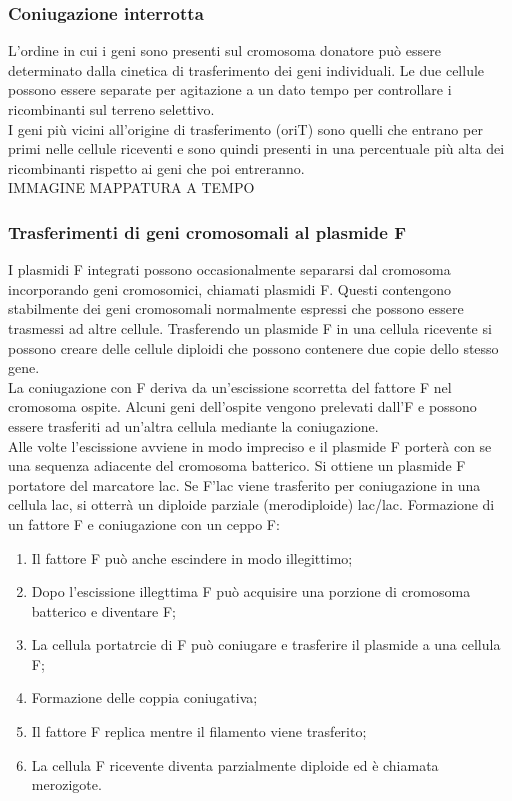\subsubsection{Coniugazione interrotta}
L'ordine in cui i geni sono presenti sul cromosoma donatore può essere determinato dalla cinetica di trasferimento dei geni individuali. Le due cellule possono essere separate per agitazione a un dato tempo per controllare i ricombinanti sul terreno selettivo.
\\I geni più vicini all'origine di trasferimento (oriT) sono quelli che entrano per primi nelle cellule riceventi e sono quindi presenti in una percentuale più alta dei ricombinanti rispetto ai geni che poi entreranno. 
\\IMMAGINE MAPPATURA A TEMPO 
\subsubsection{Trasferimenti di geni cromosomali al plasmide F}
I plasmidi F integrati possono occasionalmente separarsi dal cromosoma incorporando geni cromosomici, chiamati plasmidi F. Questi contengono stabilmente dei geni cromosomali normalmente espressi che possono essere trasmessi ad altre cellule. Trasferendo un plasmide F in una cellula ricevente si possono creare delle cellule diploidi che possono contenere due copie dello stesso gene. 
\\La coniugazione con F deriva da un'escissione scorretta del fattore F nel cromosoma ospite. Alcuni geni dell'ospite vengono prelevati dall'F e possono essere trasferiti ad un'altra cellula mediante la coniugazione. 
\\Alle volte l'escissione avviene in modo impreciso e il plasmide F porterà con se una sequenza adiacente del cromosoma batterico. Si ottiene un plasmide F portatore del marcatore lac\ap{+}. Se F'lac\ap{+} viene trasferito per coniugazione in una cellula lac\ap{-}, si otterrà un diploide parziale (merodiploide) lac\ap{+}/lac\ap{-}.
Formazione di un fattore F e coniugazione con un ceppo F\ap{-}:
\begin{enumerate}
    \item Il fattore F può anche escindere in modo illegittimo; 
    \item Dopo l'escissione illegttima F può acquisire una porzione di cromosoma batterico e diventare F;
    \item La cellula portatrcie di F può coniugare e trasferire il plasmide a una cellula F;
    \item Formazione delle coppia coniugativa;
    \item Il fattore F replica mentre il filamento viene trasferito;
    \item La cellula F ricevente diventa parzialmente diploide ed è chiamata merozigote. 
\end{enumerate}
